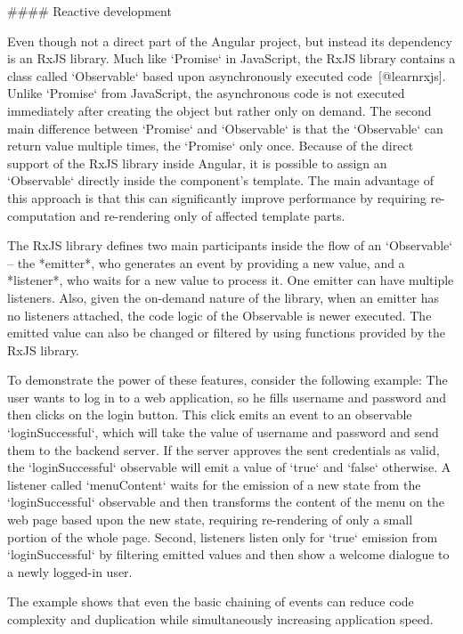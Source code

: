 \documentclass[
  digital, %
  oneside, %
  lof,     %
  nolot,     %
]{fithesis4}
\begin{document}
#### Reactive development

Even though not a direct part of the Angular project, but instead its dependency is an RxJS library. Much like `Promise` in JavaScript, the RxJS library contains a class called `Observable` based upon asynchronously executed code~[@learnrxjs]. Unlike `Promise` from JavaScript, the asynchronous code is not executed immediately after creating the object but rather only on demand. The second main difference between `Promise` and `Observable` is that the `Observable` can return value multiple times, the `Promise` only once. Because of the direct support of the RxJS library inside Angular, it is possible to assign an `Observable` directly inside the component's template. The main advantage of this approach is that this can significantly improve performance by requiring re-computation and re-rendering only of affected template parts.

The RxJS library defines two main participants inside the flow of an `Observable` -- the *emitter*, who generates an event by providing a new value, and a *listener*, who waits for a new value to process it. One emitter can have multiple listeners. Also, given the on-demand nature of the library, when an emitter has no listeners attached, the code logic of the Observable is newer executed. The emitted value can also be changed or filtered by using functions provided by the RxJS library.

To demonstrate the power of these features, consider the following example: The user wants to log in to a web application, so he fills username and password and then clicks on the login button. This click emits an event to an observable `loginSuccessful`, which will take the value of username and password and send them to the backend server. If the server approves the sent credentials as valid, the `loginSuccessful` observable will emit a value of `true` and `false` otherwise. A listener called `menuContent` waits for the emission of a new state from the `loginSuccessful` observable and then transforms the content of the menu on the web page based upon the new state, requiring re-rendering of only a small portion of the whole page. Second, listeners listen only for `true` emission from `loginSuccessful` by filtering emitted values and then show a welcome dialogue to a newly logged-in user.

The example shows that even the basic chaining of events can reduce code complexity and duplication while simultaneously increasing application speed.
\end{document}
